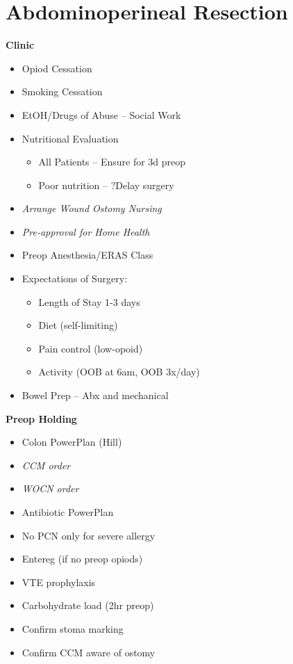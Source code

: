 \documentclass[
]{book}
\providecommand{\tightlist}{%
  \setlength{\itemsep}{0pt}\setlength{\parskip}{0pt}}
\begin{document}
\hypertarget{abdominoperineal-resection}{%
\chapter{Abdominoperineal Resection}\label{abdominoperineal-resection}}

\textbf{Clinic}

\begin{itemize}
\tightlist
\item
  Opiod Cessation
\item
  Smoking Cessation
\item
  EtOH/Drugs of Abuse -- Social Work
\item
  Nutritional Evaluation

  \begin{itemize}
  \tightlist
  \item
    All Patients -- Ensure for 3d preop
  \item
    Poor nutrition -- ?Delay surgery
  \end{itemize}
\item
  \emph{Arrange Wound Ostomy Nursing}
\item
  \emph{Pre-approval for Home Health}
\item
  Preop Anesthesia/ERAS Class
\item
  Expectations of Surgery:

  \begin{itemize}
  \tightlist
  \item
    Length of Stay 1-3 days
  \item
    Diet (self-limiting)
  \item
    Pain control (low-opoid)
  \item
    Activity (OOB at 6am, OOB 3x/day)
  \end{itemize}
\item
  Bowel Prep -- Abx and mechanical
\end{itemize}

\textbf{Preop Holding}

\begin{itemize}
\tightlist
\item
  Colon PowerPlan (Hill)
\item
  \emph{CCM order}
\item
  \emph{WOCN order}
\item
  Antibiotic PowerPlan
\item
  No PCN only for severe allergy
\item
  Entereg (if no preop opiods)
\item
  VTE prophylaxis
\item
  Carbohydrate load (2hr preop)
\item
  Confirm stoma marking
\item
  Confirm CCM aware of ostomy
\end{itemize}
\end{document}
